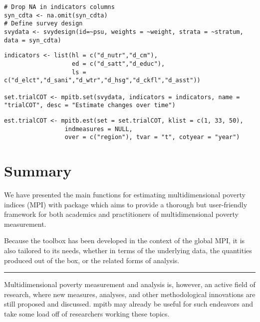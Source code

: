 \begin{verbatim}
# Drop NA in indicators columns
syn_cdta <- na.omit(syn_cdta)
# Define survey design
svydata <- svydesign(id=~psu, weights = ~weight, strata = ~stratum, data = syn_cdta)
\end{verbatim}

\begin{verbatim}
indicators <- list(hl = c("d_nutr","d_cm"),
                   ed = c("d_satt","d_educ"),
                   ls = c("d_elct","d_sani","d_wtr","d_hsg","d_ckfl","d_asst"))

set.trialCOT <- mpitb.set(svydata, indicators = indicators, name = "trialCOT", desc = "Estimate changes over time")
\end{verbatim}

\begin{verbatim}
est.trialCOT <- mpitb.est(set = set.trialCOT, klist = c(1, 33, 50),
                 indmeasures = NULL,
                 over = c("region"), tvar = "t", cotyear = "year")
\end{verbatim}

\hypertarget{summary}{%
\section{Summary}\label{summary}}

We have presented the main functions for estimating multidimensional
poverty indices (MPI) with  package which aims to provide a
thorough but user-friendly framework for both academics and
practitioners of multidimensional poverty measurement.

Because the toolbox has been developed in the context of the global MPI,
it is also tailored to its needs, whether in terms of the underlying
data, the quantities produced out of the box, or the related forms of
analysis.

\begin{center}\rule{0.5\linewidth}{0.5pt}\end{center}

Multidimensional poverty measurement and analysis is, however, an active
field of research, where new measures, analyses, and other
methodological innovations are still proposed and discussed. mpitb may
already be useful for such endeavors and take some load off of
researchers working these topics.

